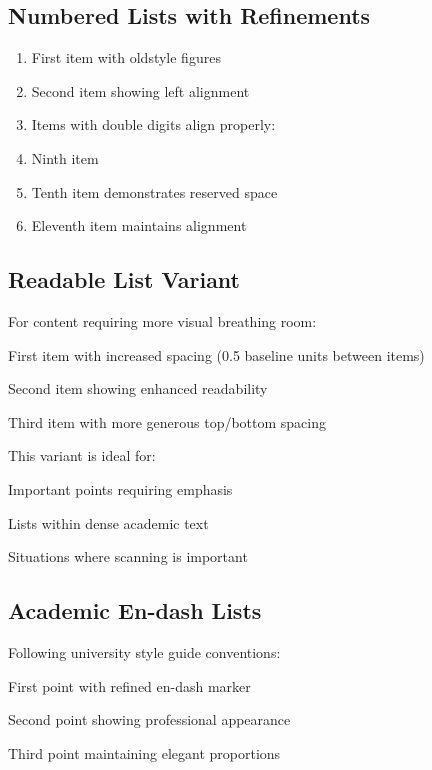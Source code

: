 \documentclass[11pt,a4paper]{article}
\begin{document}
\subsection{Numbered Lists with Refinements}

\begin{enumerate}
\item First item with oldstyle figures
\item Second item showing left alignment
\item Items with double digits align properly:
  \setcounter{enumi}{8}
\item Ninth item
\item Tenth item demonstrates reserved space
\item Eleventh item maintains alignment
\end{enumerate}

\subsection{Readable List Variant}

For content requiring more visual breathing room:
\begin{readableitem}
\item First item with increased spacing (0.5 baseline units between items)
\item Second item showing enhanced readability
\item Third item with more generous top/bottom spacing
\item This variant is ideal for:
  \begin{readableitem}
  \item Important points requiring emphasis
  \item Lists within dense academic text
  \item Situations where scanning is important
  \end{readableitem}
\end{readableitem}

\subsection{Academic En-dash Lists}

Following university style guide conventions:
\begin{academicitem}
\item First point with refined en-dash marker
\item Second point showing professional appearance
\item Third point maintaining elegant proportions
\end{academicitem}
\end{document}
